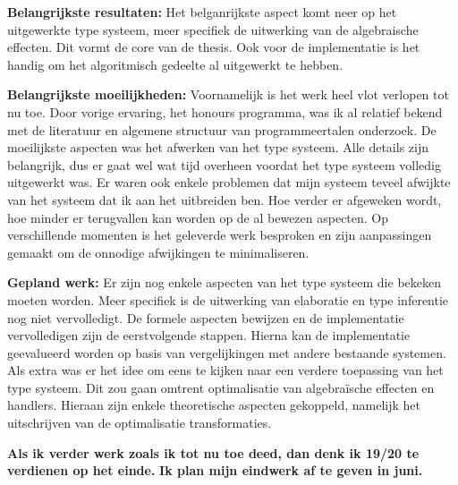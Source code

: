 \documentclass[12pt]{report}
\begin{document}
\vspace{1cm}
{\bf Belangrijkste resultaten:}
Het belganrijkste aspect komt neer op het uitgewerkte type systeem, meer specifiek de uitwerking van de algebraische effecten. Dit vormt de core van de thesis. Ook voor de implementatie is het handig om het algoritmisch gedeelte al uitgewerkt te hebben.

\vspace{1cm}
{\bf Belangrijkste moeilijkheden:}
Voornamelijk is het werk heel vlot verlopen tot nu toe. Door vorige ervaring, het honours programma, was ik al relatief bekend met de literatuur en algemene structuur van programmeertalen onderzoek. De moeilijkste aspecten was het afwerken van het type systeem. Alle details zijn belangrijk, dus er gaat wel wat tijd overheen voordat het type systeem volledig uitgewerkt was. Er waren ook enkele problemen dat mijn systeem teveel afwijkte van het systeem dat ik aan het uitbreiden ben. Hoe verder er afgeweken wordt, hoe minder er terugvallen kan worden op de al bewezen aspecten. Op verschillende momenten is het geleverde werk besproken en zijn aanpassingen gemaakt om de onnodige afwijkingen te minimaliseren.

\vspace{1cm}
{\bf Gepland werk:}
Er zijn nog enkele aspecten van het type systeem die bekeken moeten worden. Meer specifiek is de uitwerking van elaboratie en type inferentie nog niet vervolledigt. De formele aspecten bewijzen en de implementatie vervolledigen zijn de eerstvolgende stappen. Hierna kan de implementatie geevalueerd worden op basis van vergelijkingen met andere bestaande systemen. Als extra was er het idee om eens te kijken naar een verdere toepassing van het type systeem. Dit zou gaan omtrent optimalisatie van algebraïsche effecten en handlers. Hieraan zijn enkele theoretische aspecten gekoppeld, namelijk het uitschrijven van de optimalisatie transformaties. 

\vspace{1cm}
{\bf Als ik verder werk zoals ik tot nu toe deed, dan denk ik 19/20 te verdienen op het einde.}
{\bf Ik plan mijn eindwerk af te geven in juni.}
\end{document}
